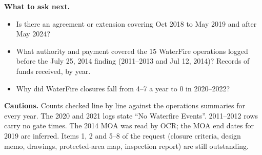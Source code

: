 \documentclass[10pt]{article}
\newcommand{\hl}[1]{\textbf{#1}}
\begin{document}
\vspace{4pt}
\hl{What to ask next.}
\begin{itemize}\setlength{\itemsep}{1pt}\setlength{\topsep}{2pt}
\item Is there an agreement or extension covering Oct 2018 to May 2019 and after May 2024?
\item What authority and payment covered the 15 WaterFire operations logged before the July 25, 2014 finding (2011--2013 and Jul 12, 2014)? Records of funds received, by year.
\item Why did WaterFire closures fall from 4--7 a year to 0 in 2020--2022?
\end{itemize}

\hl{Cautions.}
{\small Counts checked line by line against the operations summaries for every year. The 2020 and 2021 logs state ``No Waterfire Events''. 2011--2012 rows carry no gate times. The 2014 MOA was read by OCR; the MOA end dates for 2019 are inferred. Items 1, 2 and 5--8 of the request (closure criteria, design memo, drawings, protected-area map, inspection report) are still outstanding.}
\end{document}
